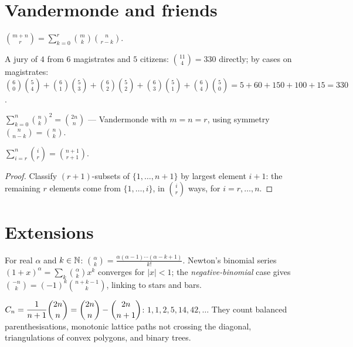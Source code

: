 \section{Vandermonde and friends}

\begin{theorem}[Vandermonde]\label{thm:vdm}
$\displaystyle\binom{m+n}{r} = \sum_{k=0}^{r}\binom{m}{k}\binom{n}{r-k}$.
\end{theorem}

\begin{example}
A jury of $4$ from $6$ magistrates and $5$ citizens:
$\binom{11}{4} = 330$ directly; by cases on magistrates:
$\binom{6}{0}\binom{5}{4} + \binom{6}{1}\binom{5}{3} +
\binom{6}{2}\binom{5}{2} + \binom{6}{3}\binom{5}{1} +
\binom{6}{4}\binom{5}{0} = 5 + 60 + 150 + 100 + 15 = 330$. \checkmark
\end{example}

\begin{theorem}
$\displaystyle\sum_{k=0}^{n} \binom{n}{k}^{2} = \binom{2n}{n}$ ---
Vandermonde with $m = n = r$, using symmetry
$\binom{n}{n-k} = \binom{n}{k}$.
\end{theorem}

\begin{theorem}\label{thm:hockey2}
$\displaystyle\sum_{i=r}^{n} \binom{i}{r} = \binom{n+1}{r+1}$.
\end{theorem}

\begin{proof}
Classify $(r+1)$-subsets of $\{1, \ldots, n+1\}$ by largest element $i+1$:
the remaining $r$ elements come from $\{1,\dots,i\}$, in $\binom{i}{r}$
ways, for $i = r, \ldots, n$.
\end{proof}

\section{Extensions}

\begin{definition}
For real $\alpha$ and $k \in \mathbb{N}$:
$\binom{\alpha}{k} = \frac{\alpha(\alpha-1)\cdots(\alpha-k+1)}{k!}$.
Newton's binomial series $(1+x)^{\alpha} = \sum_k \binom{\alpha}{k}x^{k}$
converges for $|x| < 1$; the \emph{negative-binomial} case gives
$\binom{-n}{k} = (-1)^{k}\binom{n+k-1}{k}$, linking to stars and bars.
\end{definition}

\begin{definition}
$C_n = \dfrac{1}{n+1}\dbinom{2n}{n} = \dbinom{2n}{n} - \dbinom{2n}{n+1}$:
$1, 1, 2, 5, 14, 42, \ldots$ They count balanced parenthesisations,
monotonic lattice paths not crossing the diagonal, triangulations of convex
polygons, and binary trees.
\end{definition}

